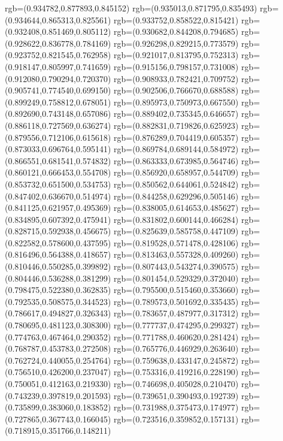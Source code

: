 {{{			rgb=(0.934782,0.877893,0.845152)
			rgb=(0.935013,0.871795,0.835493)
			rgb=(0.934644,0.865313,0.825561)
			rgb=(0.933752,0.858522,0.815421)
			rgb=(0.932408,0.851469,0.805112)
			rgb=(0.930682,0.844208,0.794685)
			rgb=(0.928622,0.836778,0.784169)
			rgb=(0.926298,0.829215,0.773579)
			rgb=(0.923752,0.821545,0.762958)
			rgb=(0.921017,0.813795,0.752313)
			rgb=(0.918147,0.805997,0.741659)
			rgb=(0.915156,0.798157,0.731008)
			rgb=(0.912080,0.790294,0.720370)
			rgb=(0.908933,0.782421,0.709752)
			rgb=(0.905741,0.774540,0.699150)
			rgb=(0.902506,0.766670,0.688588)
			rgb=(0.899249,0.758812,0.678051)
			rgb=(0.895973,0.750973,0.667550)
			rgb=(0.892690,0.743148,0.657086)
			rgb=(0.889402,0.735345,0.646657)
			rgb=(0.886118,0.727569,0.636274)
			rgb=(0.882831,0.719826,0.625923)
			rgb=(0.879556,0.712106,0.615618)
			rgb=(0.876289,0.704419,0.605357)
			rgb=(0.873033,0.696764,0.595141)
			rgb=(0.869784,0.689144,0.584972)
			rgb=(0.866551,0.681541,0.574832)
			rgb=(0.863333,0.673985,0.564746)
			rgb=(0.860121,0.666453,0.554708)
			rgb=(0.856920,0.658957,0.544709)
			rgb=(0.853732,0.651500,0.534753)
			rgb=(0.850562,0.644061,0.524842)
			rgb=(0.847402,0.636670,0.514974)
			rgb=(0.844258,0.629296,0.505146)
			rgb=(0.841125,0.621957,0.495369)
			rgb=(0.838005,0.614653,0.485627)
			rgb=(0.834895,0.607392,0.475941)
			rgb=(0.831802,0.600144,0.466284)
			rgb=(0.828715,0.592938,0.456675)
			rgb=(0.825639,0.585758,0.447109)
			rgb=(0.822582,0.578600,0.437595)
			rgb=(0.819528,0.571478,0.428106)
			rgb=(0.816496,0.564388,0.418657)
			rgb=(0.813463,0.557328,0.409260)
			rgb=(0.810446,0.550285,0.399892)
			rgb=(0.807443,0.543274,0.390575)
			rgb=(0.804446,0.536288,0.381299)
			rgb=(0.801454,0.529329,0.372040)
			rgb=(0.798475,0.522380,0.362835)
			rgb=(0.795500,0.515460,0.353660)
			rgb=(0.792535,0.508575,0.344523)
			rgb=(0.789573,0.501692,0.335435)
			rgb=(0.786617,0.494827,0.326343)
			rgb=(0.783657,0.487977,0.317312)
			rgb=(0.780695,0.481123,0.308300)
			rgb=(0.777737,0.474295,0.299327)
			rgb=(0.774763,0.467464,0.290352)
			rgb=(0.771788,0.460620,0.281424)
			rgb=(0.768787,0.453783,0.272508)
			rgb=(0.765776,0.446929,0.263640)
			rgb=(0.762724,0.440055,0.254764)
			rgb=(0.759638,0.433147,0.245872)
			rgb=(0.756510,0.426200,0.237047)
			rgb=(0.753316,0.419216,0.228190)
			rgb=(0.750051,0.412163,0.219330)
			rgb=(0.746698,0.405028,0.210470)
			rgb=(0.743239,0.397819,0.201593)
			rgb=(0.739651,0.390493,0.192739)
			rgb=(0.735899,0.383060,0.183852)
			rgb=(0.731988,0.375473,0.174977)
			rgb=(0.727865,0.367743,0.166045)
			rgb=(0.723516,0.359852,0.157131)
			rgb=(0.718915,0.351766,0.148211)
}}}
